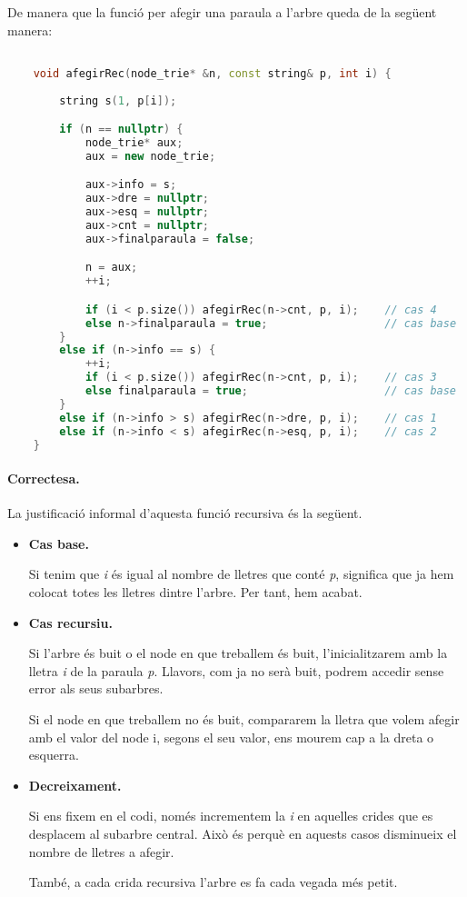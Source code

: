 \documentclass[titlepage]{article}
\begin{document}
De manera que la funció per afegir una paraula a l'arbre queda de la següent manera:
\clearpage
\begin{lstlisting}[language=C++]

    void afegirRec(node_trie* &n, const string& p, int i) {
    
        string s(1, p[i]);

        if (n == nullptr) {
            node_trie* aux;
            aux = new node_trie;

            aux->info = s;
            aux->dre = nullptr;
            aux->esq = nullptr;
            aux->cnt = nullptr;
            aux->finalparaula = false;

            n = aux;
            ++i;

            if (i < p.size()) afegirRec(n->cnt, p, i);    // cas 4
            else n->finalparaula = true;                  // cas base
        }
        else if (n->info == s) {
            ++i;
            if (i < p.size()) afegirRec(n->cnt, p, i);    // cas 3
            else finalparaula = true;                     // cas base
        }
        else if (n->info > s) afegirRec(n->dre, p, i);    // cas 1
        else if (n->info < s) afegirRec(n->esq, p, i);    // cas 2
    }

\end{lstlisting}

\paragraph{Correctesa.} La justificació informal d'aquesta funció recursiva és la següent.
\begin{itemize}
    \item \textbf{Cas base.} \par
    Si tenim que \textit{i} és igual al nombre de lletres que conté \textit{p}, significa que ja hem colocat totes les lletres dintre l'arbre. Per tant, hem acabat.
    \item \textbf{Cas recursiu.}\par
    Si l'arbre és buit o el node en que treballem és buit, l'inicialitzarem amb la lletra \textit{i} de la paraula \textit{p}. Llavors, com ja no serà buit, podrem accedir sense error als seus subarbres. \par
    Si el node en que treballem no és buit, compararem la lletra que volem afegir amb el valor del node i, segons el seu valor, ens mourem cap a la dreta o esquerra.
    \item \textbf{Decreixament.}\par
    Si ens fixem en el codi, només incrementem la \textit{i} en aquelles crides que es desplacem al subarbre central. Això és perquè en aquests casos disminueix el nombre de lletres a afegir.\par
    També, a cada crida recursiva l'arbre es fa cada vegada més petit.
\end{itemize}
\end{document}
